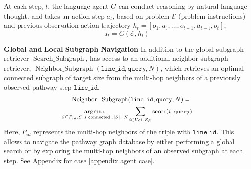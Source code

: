 

At each step, $t$, the language agent $G$ can conduct reasoning by natural language thought, and takes an action step $a_t$, based on problem $\mathcal{E}$ (problem instructions) and previous observation-action trajectory $h_t=[o_1,a_1, \dots, o_{t-1}, a_{t-1}, o_t]$, 
\begin{equation}
  a_t =G(\mathcal{E}, h_t)  
\end{equation}

\textbf{Global and Local Subgraph Navigation} In addition to the global subgraph retriever $\operatorname{Search\_Subgraph}$, \modelname has access to an additional neighbor subgraph retriever, $\operatorname{Neighbor\_Subgraph}(\texttt{line\_id}, \texttt{query}, N)$, which retrieves an optimal connected subgraph of target size from the multi-hop neighbors of a previously observed pathway step $\texttt{line\_id}$.
\begin{equation}
\small
\begin{aligned}
\operatorname{Neighbor\_Subgraph}&(\texttt{line\_id}, \texttt{query}, N)= \\\underset{\substack{S \subseteq P_{id}, S \text { is connected }, |S|=N}}{\operatorname{argmax}} &\sum_{i \in V_S \cup E_S} \operatorname{score}(i, \texttt{query})
\end{aligned}
\end{equation}
Here, $P_{id}$ represents the multi-hop neighbors of the triple with $\texttt{line\_id}$. This allows \modelname to navigate the pathway graph database by either performing a global search or by exploring the multi-hop neighbors of an observed subgraph at each step. See Appendix for case \ref{appendix agent case}.

